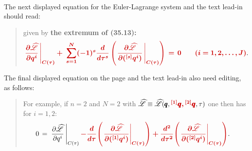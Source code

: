 \documentclass[12pt]{GeomPhysBOOK}
\newcommand\correct[1]{{\color{red!80!black}\bf #1}}
\newcommand\mcorrect[1]{{\color{red!80!black}\bm{#1}}}
\begin{document}
\begin{enumerate}[leftmargin=1.9cm,labelwidth=1.4cm,itemsep=0.5cm]
\begin{align*}
		\end{align*}
		The next displayed equation for the Euler-Lagrange system and the text lead-in should read:
		\begin{quote}
			given by \correct{the extremum of (35.13):}
			\begin{align*}
				\mcorrect{\left.\frac{\partial\wh{\mathscr{L}}}{\partial q^{i}}\,\right|_{C(\tau)} +\; \sum_{s=1}^{N}(-1)^{s}\frac{d}{d\tau^{s}}\left(  \left.\frac{\partial\wh{\mathscr{L}}}{\partial ({}^{[s]}q^{i})}\,\right|_{C(\tau)}  \right) \,=\, 0 \qquad (i=1,2,\ldots,J)}.
			\end{align*}
		\end{quote}
		The final displayed equation on the page and the text lead-in also need editing, as follows:
		\begin{quote}
			For example, if $n=2$ and $N=2$ with $\wh{\mathscr{L}}\equiv\wh{\mathscr{L}}(\qq,\mcorrect{{}^{[1]}\qq,{}^{[2]}\qq},\tau)$ one then has for $i=1,2$:
			\begin{align*}
				0 	&\,=\, \left.\frac{\partial\wh{\mathscr{L}}}{\partial q^{i}}\,\right|_{C(\tau)} \mcorrect{ - \frac{d}{d\tau}\!\left(\left.\frac{\partial\wh{\mathscr{L}}}{\partial ({}^{[1]}q^{i})} \right|_{C(\tau)} \right) +  \frac{d^{2}}{d\tau^{2}}\!\left(\left.\frac{\partial\wh{\mathscr{L}}}{\partial ({}^{[2]}q^{i})}\right|_{C(\tau)}\right) }.
			\end{align*}
		\end{quote}
\end{enumerate}

\end{document}
